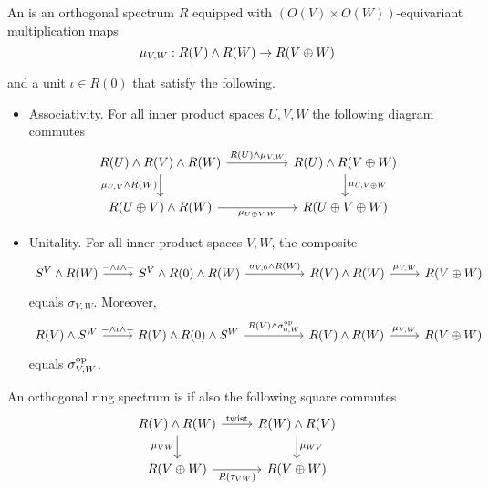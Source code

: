 \begin{definition}
An  is an orthogonal spectrum $R$ equipped with $(O(V)\times O(W))$-equivariant multiplication maps
\[\mu_{V,W}:R(V)\wedge R(W)\to R(V\oplus W)\]

and a unit $\iota\in R(0)$ that satisfy the following.
\begin{itemize}
\item Associativity. For all inner product spaces $U,V,W$ the following diagram commutes
\[
\begin{tikzcd}
R(U) \smsh R(V) \smsh R(W) \arrow[rr, "{ R(U) \smsh \mu_{V,W}}"] \arrow[d, swap, "\mu_{U,V} \smsh R(W)"] & & R(U) \smsh R(V \oplus W) \arrow[d, "\mu_{U, V \oplus W}"]\\
R(U \oplus V) \smsh R(W) \arrow[rr, "\mu_{U \oplus V, W}", swap] & & R(U \oplus V \oplus W)
\end{tikzcd}
\]
\item Unitality. For all inner product spaces $V,W$, the composite
\[
\begin{tikzcd}
S^V \smsh R(W) \arrow[r, "- \smsh \iota \smsh -"] & S^V \smsh R(0) \smsh R(W) \arrow[rr, "{\sigma_{V,0} \smsh R(W)}"] & & R(V) \smsh R(W) \arrow[r, "\mu_{V,W}"] & R(V \oplus W)
\end{tikzcd}
\]
equals $\sigma_{V,W}$. Moreover,
\[
\begin{tikzcd}
R(V) \smsh S^W \arrow[r, "- \smsh \iota \smsh -"] & R(V) \smsh R(0) \smsh S^W \arrow[rr, "{R(V) \smsh \sigma_{0,W}^{\op}}"] & & R(V) \smsh R(W) \arrow[r, "\mu_{V,W}"] & R(V \oplus W)
\end{tikzcd}
\]
equals $\sigma_{V,W}^{{\operatorname{op}}}$.
\end{itemize}
An orthogonal ring spectrum is  if also the following square commutes
\[
\begin{tikzcd}
R(V) \smsh R(W) \arrow[r, "\text{twist}"] \arrow[d, "\mu_{VW}", swap] & R(W) \smsh R(V) \arrow[d, "\mu_{WV}"]\\
R(V \oplus W) \arrow[r, "R(\tau_{VW})", swap] & R(V \oplus W)
\end{tikzcd}
\]
\end{definition}


